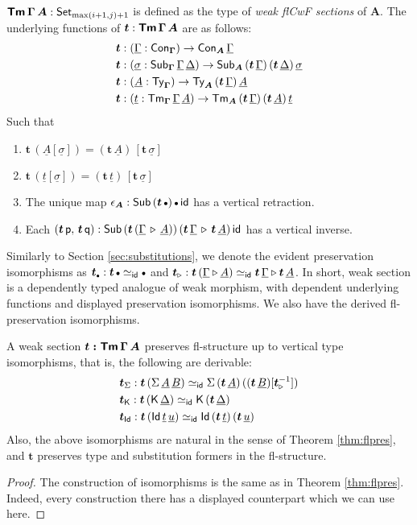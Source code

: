 \documentclass[sigplan,review,anonymous]{acmart}\settopmatter{printfolios=true,printccs=false,printacmref=false}
\newcommand{\ext}{\triangleright}
\newcommand{\emptycon}{\scaleobj{.75}\bullet}
\newcommand{\p}{\mathsf{p}}
\newcommand{\q}{\mathsf{q}}
\newcommand{\bTm}{\boldsymbol{\Tm}}
\newcommand{\bGamma}{\boldsymbol{\Gamma}}
\newcommand{\bt}{\boldsymbol{t}}
\newcommand{\bA}{\boldsymbol{A}}
\newcommand{\ul}[1]{\underline{#1}}
\newcommand{\ulGamma}{\ul{\Gamma}}
\newcommand{\ulDelta}{\ul{\Delta}}
\newcommand{\ulsigma}{\ul{\sigma}}
\newcommand{\ult}{\ul{t}}
\newcommand{\ulu}{\ul{u}}
\newcommand{\ulA}{\ul{A}}
\newcommand{\ulB}{\ul{B}}
\begin{document}
$\boldsymbol{\mathsf{Tm}\,\Gamma\,A} : \mathsf{Set}_{\max(i+1, j)+1}$ is defined as the type of
\emph{weak flCwF sections} of $\bA$. The underlying functions of $\bt :
\bTm\,\bGamma\,\bA$ are as follows:
\begin{alignat*}{3}
  & \bt : (\ulGamma : \Con_{\bGamma}) \ra \Con_{\bA}\,\ulGamma\\
  & \bt : (\ulsigma : \Sub_{\bGamma}\,\ulGamma\,\ulDelta)
         \ra \Sub_{\bA}\,(\bt\,\ulGamma)\,(\bt\,\ulDelta)\,\ulsigma\\
  & \bt : (\ulA : \Ty_{\bGamma}) \ra \Ty_{\bA}\,(\bt\,\ulGamma)\,\ulA\\
  & \bt : (\ult : \Tm_{\bGamma}\,\ulGamma\,\ulA) \ra
          \Tm_{\bA}\,(\bt\,\ulGamma)\,(\bt\,\ulA)\,\ult
\end{alignat*}
Such that
\begin{enumerate}
  \item $\bt\,(\ulA[\ulsigma]) = (\bt\,\ulA)\,[\bt\,\ulsigma]$
  \item $\bt\,(\ult[\ulsigma]) = (\bt\,\ult)\,[\bt\,\ulsigma]$
  \item The unique map $\epsilon_{\bA} : \Sub\,(\bt\,\emptycon)\,\emptycon\,\id$ has a vertical retraction.
  \item Each $(\bt\,\p,\,\bt\,\q) : \Sub\,(\bt\,(\ulGamma\,\ext\,\ulA))\,(\bt\,\ulGamma\,\ext\,\bt\,\ulA)\,\id$ has a vertical inverse.
\end{enumerate}

Similarly to Section \ref{sec:substitutions}, we denote the evident preservation
isomorphisms as $\bt_{\emptycon} : \bt\,\emptycon \simeq_{\id} \emptycon$ and
$\bt_{\ext} : \bt\,(\ulGamma\ext \ulA) \simeq_{\id} \bt\,\ulGamma \ext
\bt\,\ulA$. In short, weak section is a dependently typed analogue of weak
morphism, with dependent underlying functions and displayed preservation
isomorphisms. We also have the derived fl-preservation isomorphisms.

\begin{theorem} A weak section $\boldsymbol{t : \mathsf{Tm}\,\Gamma\,A}$ preserves fl-structure up to vertical type isomorphisms, that is, the following are derivable:
\begin{alignat*}{3}
  & \bt_{\Sigma} : \bt\,(\Sigma\,\ulA\,\ulB) \simeq_{\id} \Sigma\,(\bt\,\ulA)\,((\bt\,\ulB)[\bt_{\ext}^{-1}]) \\
  & \bt_{\K} : \bt\,(\K\,\ulDelta) \simeq_{\id} \K\,(\bt\,\ulDelta) \\
  & \bt_{\Id} : \bt\,(\Id\,\ult\,\ulu) \simeq_{\id} \Id\,(\bt\,\ult)\,(\bt\,\ulu)
\end{alignat*}
Also, the above isomorphisms are natural in the sense of Theorem
\ref{thm:flpres}, and $\bt$ preserves type and substitution formers in the
fl-structure.
\end{theorem}
\begin{proof} The construction of isomorphisms is the same as in Theorem \ref{thm:flpres}. Indeed, every construction there has a displayed counterpart which we can use here.
\end{proof}
\end{document}
